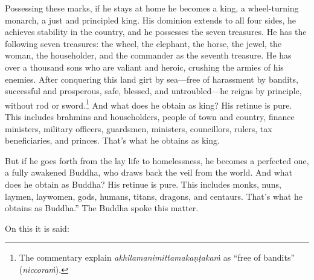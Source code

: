 \documentclass[12pt,openany]{book}%
\begin{document}
Possessing these marks, if he stays at home he becomes a king, a wheel-turning monarch, a just and principled king. His dominion extends to all four sides, he achieves stability in the country, and he possesses the seven treasures. He has the following seven treasures: the wheel, the elephant, the horse, the jewel, the woman, the householder, and the commander as the seventh treasure. He has over a thousand sons who are valiant and heroic, crushing the armies of his enemies. After conquering this land girt by sea—free of harassment by bandits, successful and prosperous, safe, blessed, and untroubled—he reigns by principle, without rod or sword.\footnote{The commentary explain \textit{\textsanskrit{akhilamanimittamakaṇṭakaṁ}} as “free of bandits” (\textit{\textsanskrit{niccoraṁ}}). } And what does he obtain as king? His retinue is pure. This includes brahmins and householders, people of town and country, finance ministers, military officers, guardsmen, ministers, councillors, rulers, tax beneficiaries, and princes. That’s what he obtains as king. 

But if he goes forth from the lay life to homelessness, he becomes a perfected one, a fully awakened Buddha, who draws back the veil from the world. And what does he obtain as Buddha? His retinue is pure. This includes monks, nuns, laymen, laywomen, gods, humans, titans, dragons, and centaurs. That’s what he obtains as Buddha.” The Buddha spoke this matter. 

On this it is said: 
\end{document}
